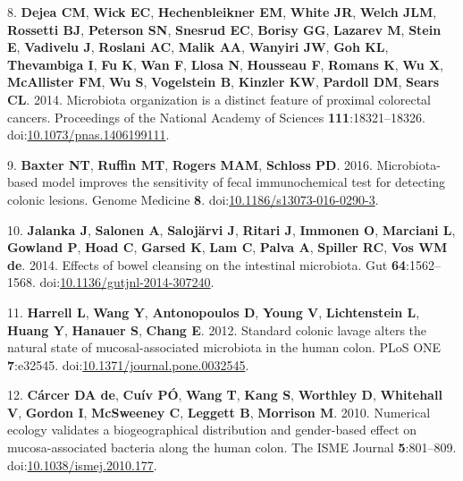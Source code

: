 \documentclass[11pt,]{article}
\begin{document}
\hypertarget{ref-Dejea2014}{}
8. \textbf{Dejea CM}, \textbf{Wick EC}, \textbf{Hechenbleikner EM},
\textbf{White JR}, \textbf{Welch JLM}, \textbf{Rossetti BJ},
\textbf{Peterson SN}, \textbf{Snesrud EC}, \textbf{Borisy GG},
\textbf{Lazarev M}, \textbf{Stein E}, \textbf{Vadivelu J},
\textbf{Roslani AC}, \textbf{Malik AA}, \textbf{Wanyiri JW}, \textbf{Goh
KL}, \textbf{Thevambiga I}, \textbf{Fu K}, \textbf{Wan F}, \textbf{Llosa
N}, \textbf{Housseau F}, \textbf{Romans K}, \textbf{Wu X},
\textbf{McAllister FM}, \textbf{Wu S}, \textbf{Vogelstein B},
\textbf{Kinzler KW}, \textbf{Pardoll DM}, \textbf{Sears CL}. 2014.
Microbiota organization is a distinct feature of proximal colorectal
cancers. Proceedings of the National Academy of Sciences
\textbf{111}:18321--18326.
doi:\href{https://doi.org/10.1073/pnas.1406199111}{10.1073/pnas.1406199111}.

\hypertarget{ref-Baxter2016}{}
9. \textbf{Baxter NT}, \textbf{Ruffin MT}, \textbf{Rogers MAM},
\textbf{Schloss PD}. 2016. Microbiota-based model improves the
sensitivity of fecal immunochemical test for detecting colonic lesions.
Genome Medicine \textbf{8}.
doi:\href{https://doi.org/10.1186/s13073-016-0290-3}{10.1186/s13073-016-0290-3}.

\hypertarget{ref-Jalanka2014}{}
10. \textbf{Jalanka J}, \textbf{Salonen A}, \textbf{Salojärvi J},
\textbf{Ritari J}, \textbf{Immonen O}, \textbf{Marciani L},
\textbf{Gowland P}, \textbf{Hoad C}, \textbf{Garsed K}, \textbf{Lam C},
\textbf{Palva A}, \textbf{Spiller RC}, \textbf{Vos WM de}. 2014. Effects
of bowel cleansing on the intestinal microbiota. Gut
\textbf{64}:1562--1568.
doi:\href{https://doi.org/10.1136/gutjnl-2014-307240}{10.1136/gutjnl-2014-307240}.

\hypertarget{ref-Harrell2012}{}
11. \textbf{Harrell L}, \textbf{Wang Y}, \textbf{Antonopoulos D},
\textbf{Young V}, \textbf{Lichtenstein L}, \textbf{Huang Y},
\textbf{Hanauer S}, \textbf{Chang E}. 2012. Standard colonic lavage
alters the natural state of mucosal-associated microbiota in the human
colon. PLoS ONE \textbf{7}:e32545.
doi:\href{https://doi.org/10.1371/journal.pone.0032545}{10.1371/journal.pone.0032545}.

\hypertarget{ref-deCarcer2010}{}
12. \textbf{Cárcer DA de}, \textbf{Cuív PÓ}, \textbf{Wang T},
\textbf{Kang S}, \textbf{Worthley D}, \textbf{Whitehall V},
\textbf{Gordon I}, \textbf{McSweeney C}, \textbf{Leggett B},
\textbf{Morrison M}. 2010. Numerical ecology validates a biogeographical
distribution and gender-based effect on mucosa-associated bacteria along
the human colon. The ISME Journal \textbf{5}:801--809.
doi:\href{https://doi.org/10.1038/ismej.2010.177}{10.1038/ismej.2010.177}.
\end{document}
